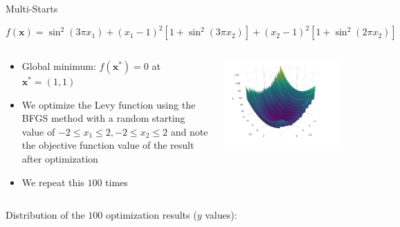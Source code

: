 \documentclass[11pt,compress,t,notes=noshow, xcolor=table]{beamer}
\begin{document}
\begin{vbframe}{Multi-Starts}


\footnotesize
$$
f(\bm{x}) = \sin^2(3\pi x_1) + (x_1 - 1)^2 [1 + \sin^2(3\pi x_2)] + (x_2 -1)^2
[1 + \sin^2(2\pi x_2)]
$$
\begin{columns}
\begin{column}{0.5\textwidth}
   \footnotesize
  \vspace{-0.2cm}
  \begin{itemize}
    \item Global minimum: $f(\bm{x}^*) = 0$ at $\bm{x}^* = (1,1)$
    \item We optimize the Levy function using the BFGS method with a random starting value of $-2\leq x_1 \leq 2, -2\leq     x_2 \leq 2$ and note the objective function value of the result after optimization
    \item We repeat this $100$ times
    \end{itemize}
\end{column}
\begin{column}{0.5\textwidth}  %
    \begin{center}
  \includegraphics[width = 0.9\textwidth]{figure_man/levy.png}
  \end{center}
\end{column}
\end{columns}





Distribution of the $100$ optimization results ($y$ values):
\vspace{0.1cm}


\end{vbframe}
\end{document}
